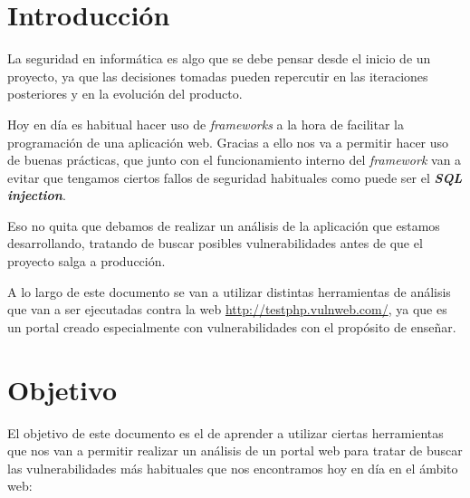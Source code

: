 \documentclass{\ClassPath/viu-tfm-template}
\begin{document}
\graphicspath{{../VIU_TFM_LaTeX_template/}}

\coverpage

\tableofcontents

\chapter{Introducción}

La seguridad en informática es algo que se debe pensar desde el inicio de un proyecto, ya que las decisiones tomadas pueden repercutir en las iteraciones posteriores y en la evolución del producto.

Hoy en día es habitual hacer uso de \textit{frameworks} a la hora de facilitar la programación de una aplicación web. Gracias a ello nos va a permitir hacer uso de buenas prácticas, que junto con el funcionamiento interno del \textit{framework} van a evitar que tengamos ciertos fallos de seguridad habituales como puede ser el \textbf{\textit{SQL injection}}.

Eso no quita que debamos de realizar un análisis de la aplicación que estamos desarrollando, tratando de buscar posibles vulnerabilidades antes de que el proyecto salga a producción.

A lo largo de este documento se van a utilizar distintas herramientas de análisis que van a ser ejecutadas contra la web \href{http://testphp.vulnweb.com/}{http://testphp.vulnweb.com/}, ya que es un portal creado especialmente con vulnerabilidades con el propósito de enseñar.


\chapter{Objetivo}
El objetivo de este documento es el de aprender a utilizar ciertas herramientas que nos van a permitir realizar un análisis de un portal web para tratar de buscar las vulnerabilidades más habituales que nos encontramos hoy en día en el ámbito web:
\end{document}
